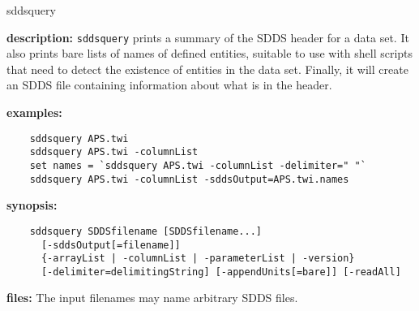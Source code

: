 \begin{sddsprog}{sddsquery}
  \item \textbf{description:}
    \verb|sddsquery| prints a summary of the SDDS header for a data set. It also prints bare lists of names of defined entities,
    suitable to use with shell scripts that need to detect the existence of entities in the data set. Finally, it will create an
    SDDS file containing information about what is in the header.
  \item \textbf{examples:}
    \begin{verbatim}
    sddsquery APS.twi
    sddsquery APS.twi -columnList
    set names = `sddsquery APS.twi -columnList -delimiter=" "`
    sddsquery APS.twi -columnList -sddsOutput=APS.twi.names
    \end{verbatim}
  \item \textbf{synopsis:}
    \begin{verbatim}
    sddsquery SDDSfilename [SDDSfilename...]
      [-sddsOutput[=filename]]
      {-arrayList | -columnList | -parameterList | -version}
      [-delimiter=delimitingString] [-appendUnits[=bare]] [-readAll]
    \end{verbatim}
  \item \textbf{files:} The input filenames may name arbitrary SDDS files.


\end{sddsprog}
